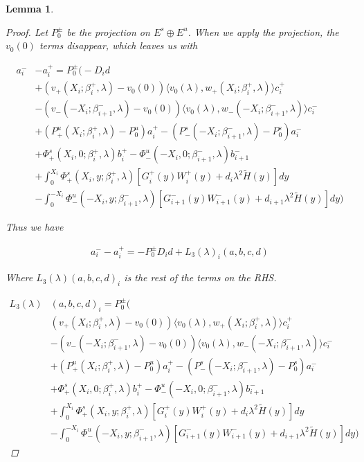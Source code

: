 \documentclass[12pt]{article}
\newtheorem{lemma}{Lemma}
\begin{document}
\begin{lemma}
\begin{proof}
Let $P_0^\pm$ be the projection on $E^s \oplus E^u$. When we apply the projection, the $v_0(0)$ terms disappear, which leaves us with

\begin{align*}
a_i^- &- a_i^+ = P_0^\pm \Big(-D_i d \\
&+(v_+(X_i; \beta_i^+, \lambda) - v_0(0)) \langle v_0(\lambda), w_+(X_i; \beta_i^+, \lambda) \rangle c_i^+ \\
&- (v_-(-X_i; \beta_{i+1}^-,\lambda) - v_0(0)) \langle v_0(\lambda), w_-(-X_i; \beta_{i+1}^-, \lambda) \rangle c_i^- \\
&+ (P^u_+(X_i; \beta_i^+, \lambda) - P_0^u)a_i^+ - (P^s_-(-X_i; \beta_{i+1}^-, \lambda) - P_0^s)a_i^- \\
&+ \Phi^s_+(X_i, 0; \beta_i^+, \lambda)b_i^+ - \Phi^u_-(-X_i, 0; \beta_{i+1}^-, \lambda)b_{i+1}^- \\
&+ \int_0^{X_i} \Phi^s_+(X_i, y; \beta_i^+, \lambda) [ G_i^+(y) W_i^+(y) + d_i \lambda^2 \tilde{H}(y) ] dy \\
&- \int_0^{-X_i} \Phi^u_-(-X_i, y; \beta_{i+1}^-, \lambda) [ G_{i+1}^-(y) W_{i+1}^-(y) + d_{i+1} \lambda^2 \tilde{H}(y) ] dy \Big)
\end{align*}

Thus we have

\begin{align*}
a_i^- - a_i^+ = -P_0^\pm D_i d + L_3(\lambda)_i(a, b, c, d)
\end{align*}

Where $L_3(\lambda)(a, b, c, d)_i$ is the rest of the terms on the RHS.

\begin{align*}
L_3(\lambda)&(a, b, c, d)_i = P_0^\pm \Big( \\
&(v_+(X_i; \beta_i^+, \lambda) - v_0(0)) \langle v_0(\lambda), w_+(X_i; \beta_i^+, \lambda) \rangle c_i^+ \\
&- (v_-(-X_i; \beta_{i+1}^-, \lambda) - v_0(0)) \langle v_0(\lambda), w_-(-X_i; \beta_{i+1}^-, \lambda) \rangle c_i^- \\
&+ (P^u_+(X_i; \beta_i^+, \lambda) - P_0^u)a_i^+ - (P^s_-(-X_i; \beta_{i+1}^-, \lambda) - P_0^s)a_i^- \\
&+ \Phi^s_+(X_i, 0; \beta_i^+, \lambda)b_i^+ - \Phi^u_-(-X_i, 0; \beta_{i+1}^-, \lambda)b_{i+1}^- \\
&+ \int_0^{X_i} \Phi^s_+(X_i, y; \beta_i^+, \lambda) [ G_i^+(y) W_i^+(y) + d_i \lambda^2 \tilde{H}(y) ] dy \\
&- \int_0^{-X_i} \Phi^u_-(-X_i, y; \beta_{i+1}^-, \lambda) [ G_{i+1}^-(y) W_{i+1}^-(y) + d_{i+1} \lambda^2 \tilde{H}(y) ] dy \Big)
\end{align*}


\end{proof}
\end{lemma}
\end{document}
